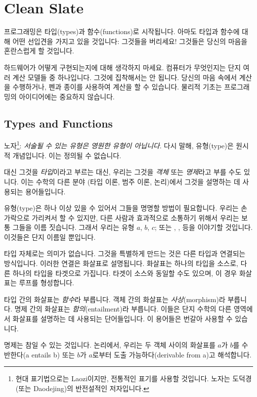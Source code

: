 \documentclass[DaoFP]{subfiles}
\begin{document}
\chapter{Clean Slate}

프로그래밍은 타입(types)과 함수(functions)로 시작됩니다. 아마도 타입과 함수에 대해 어떤 선입견을 가지고 있을 것입니다: 그것들을 버리세요! 그것들은 당신의 마음을 혼란스럽게 할 것입니다.

하드웨어가 어떻게 구현되는지에 대해 생각하지 마세요. 컴퓨터가 무엇인지는 단지 여러 계산 모델들 중 하나입니다. 그것에 집착해서는 안 됩니다. 당신의 마음 속에서 계산을 수행하거나, 펜과 종이를 사용하여 계산을 할 수 있습니다. 물리적 기초는 프로그래밍의 아이디어에는 중요하지 않습니다.

\section{Types and Functions}

노자\footnote{현대 표기법으로는 Laozi이지만, 전통적인 표기를 사용할 것입니다. 노자는 도덕경(또는 Daodejing)의 반전설적인 저자입니다.}: \emph{서술될 수 있는 유형은 영원한 유형이 아닙니다}. 다시 말해, 유형(type)은 원시적 개념입니다. 이는 정의될 수 없습니다.

대신 그것을 \emph{타입}이라고 부르는 대신, 우리는 그것을 \emph{객체} 또는 \emph{명제}라고 부를 수도 있니다. 이는 수학의 다른 분야 (타입 이론, 범주 이론, 논리)에서 그것을 설명하는 데 사용되는 용어들입니다.

유형(type)은 하나 이상 있을 수 있어서 그들을 명명할 방법이 필요합니다. 우리는 손가락으로 가리켜서 할 수 있지만, 다른 사람과 효과적으로 소통하기 위해서 우리는 보통 그들을 이름 짓습니다. 그래서 우리는 유형 $a$, $b$, $c$; 또는 , ,  등을 이야기할 것입니다. 이것들은 단지 이름일 뿐입니다.

타입 자체로는 의미가 없습니다. 그것을 특별하게 만드는 것은 다른 타입과 연결되는 방식입니다. 이러한 연결은 화살표로 설명됩니다. 화살표는 하나의 타입을 소스로, 다른 하나의 타입을 타겟으로 가집니다. 타겟이 소스와 동일할 수도 있으며, 이 경우 화살표는 루프를 형성합니다.

타입 간의 화살표는 \emph{함수}라 부릅니다. 객체 간의 화살표는 \emph{사상}(morphism)라 부릅니다. 명제 간의 화살표는 \emph{함의}(entailment)라 부릅니다. 이들은 단지 수학의 다른 영역에서 화살표를 설명하는 데 사용되는 단어들입니다. 이 용어들은 번갈아 사용할 수 있습니다.

명제는 참일 수 있는 것입니다. 논리에서, 우리는 두 객체 사이의 화살표를 $a$가 $b$를 수반한다(a entails b) 또는 $b$가 $a$로부터 도출 가능하다(derivable from a)고 해석합니다.
\pagebreak
\end{document}
